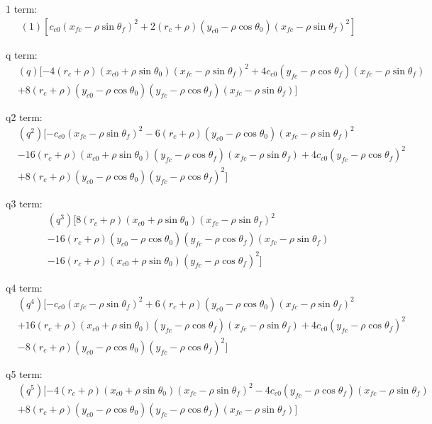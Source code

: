 \documentclass[12pt]{article}
\begin{document}
1 term:
\begin{align*}
    &(1)[c_{c0}(x_{fc} - \rho\sin\theta_f)^2 + 2(r_c+\rho)(y_{c0} - \rho\cos\theta_0)(x_{fc} - \rho\sin\theta_f)^2]
\end{align*}

q term:
\begin{align*}
    &(q)[- 4(r_c+\rho)(x_{c0} +\rho\sin\theta_0)(x_{fc} - \rho\sin\theta_f)^2 + 4c_{c0}(y_{fc} - \rho\cos\theta_f)(x_{fc} - \rho\sin\theta_f)\\
    &+ 8(r_c+\rho)(y_{c0} - \rho\cos\theta_0)(y_{fc} - \rho\cos\theta_f)(x_{fc} - \rho\sin\theta_f)]
\end{align*}

q2 term:
\begin{align*}
    &(q^2)[ -c_{c0}(x_{fc} - \rho\sin\theta_f)^2 -6(r_c+\rho)(y_{c0} - \rho\cos\theta_0)(x_{fc} - \rho\sin\theta_f)^2\\
    &- 16(r_c+\rho)(x_{c0} +\rho\sin\theta_0)(y_{fc} - \rho\cos\theta_f)(x_{fc} - \rho\sin\theta_f) + 4c_{c0}(y_{fc} - \rho\cos\theta_f)^2\\
    &+ 8(r_c+\rho)(y_{c0} - \rho\cos\theta_0)(y_{fc} - \rho\cos\theta_f)^2 ]
\end{align*}

q3 term:
\begin{align*}
    &(q^3)[8(r_c+\rho)(x_{c0} +\rho\sin\theta_0)(x_{fc} - \rho\sin\theta_f)^2\\
    &-16(r_c+\rho)(y_{c0} - \rho\cos\theta_0)(y_{fc} - \rho\cos\theta_f)(x_{fc} - \rho\sin\theta_f)\\
    &- 16(r_c+\rho)(x_{c0} +\rho\sin\theta_0)(y_{fc} - \rho\cos\theta_f)^2]
\end{align*}

q4 term:
\begin{align*}
    &(q^4)[ -c_{c0}(x_{fc} - \rho\sin\theta_f)^2 + 6(r_c+\rho)(y_{c0} - \rho\cos\theta_0)(x_{fc} - \rho\sin\theta_f)^2\\
    &+ 16(r_c+\rho)(x_{c0} +\rho\sin\theta_0)(y_{fc} - \rho\cos\theta_f)(x_{fc} - \rho\sin\theta_f) + 4c_{c0}(y_{fc} - \rho\cos\theta_f)^2\\
    &- 8(r_c+\rho)(y_{c0} - \rho\cos\theta_0)(y_{fc} - \rho\cos\theta_f)^2]
\end{align*}

q5 term:
\begin{align*}
    &(q^5)[ - 4(r_c+\rho)(x_{c0} +\rho\sin\theta_0)(x_{fc} - \rho\sin\theta_f)^2 - 4c_{c0}(y_{fc} - \rho\cos\theta_f)(x_{fc} - \rho\sin\theta_f)\\
    &+ 8(r_c+\rho)(y_{c0} - \rho\cos\theta_0)(y_{fc} - \rho\cos\theta_f)(x_{fc} - \rho\sin\theta_f) ]
\end{align*}
\end{document}

